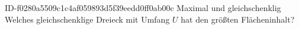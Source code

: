 \begin{exercise}
      {ID-f0280a5509c1c4af059893d5f39eedd0ff0ab00c}
      {Maximal und gleichschenklig}
  \ifproblem\problem
    Welches gleichschenklige Dreieck mit Umfang $U$ hat den größten Flächeninhalt?
  \fi
\end{exercise}
